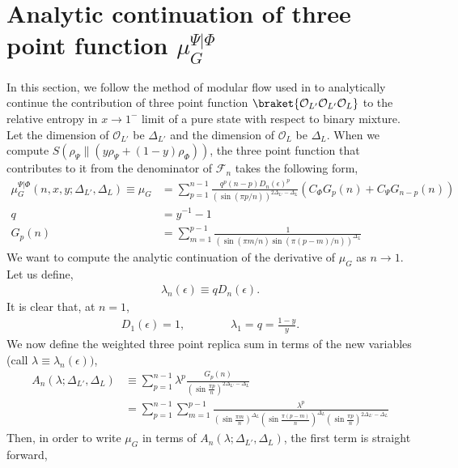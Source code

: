 \documentclass[11pt]{article}
\newcommand{\ep}{\epsilon}
\newcommand{\mO}{\mathcal{O}}
\newcommand{\lb}{\left(}
\newcommand{\rb}{\right)}
\begin{document}
\section{\texorpdfstring{Analytic continuation of three point function $\mu_G^{\Psi|\Phi}$}{Analytic continuation of three point function mu large interval}}
In this section, we follow the method of modular flow used in \cite{S_rosi_2018} to analytically continue the contribution of three point function $\braket{\mO_{L'}\mO_{L'}\mO_L}$ to the relative entropy in $x\to 1^-$ limit of a pure state with respect to binary mixture. Let the dimension of $\mO_{L'}$ be $\Delta_{L'}$ and the dimension of $\mO_L$ be $\Delta_L$. When we compute $S(\rho_\Psi \| \lb y\rho_\Psi + (1-y)\rho_\Phi\rb)$, the three point function that contributes to it from the denominator of $\mathcal{F}_n$ takes the following form,
\begin{align}
    \mu_G^{\Psi|\Phi} (n,x,y;\Delta_{L'},\Delta_L) \equiv \mu_G &= \sum_{p=1}^{n-1}   \frac{q^p (n-p)D_n(\ep)^{p}}{\lb \sin(\pi p/n)\rb^{2\Delta_{L'}-\Delta_L}} \lb C_\Phi G_p(n) + C_\Psi G_{n-p}(n)\rb \\
    q &= y^{-1}-1 \\
    G_p(n) &= \sum_{m=1}^{p-1} \frac{1}{\lb \sin(\pi m/n) \sin(\pi (p-m)/n)\rb^{\Delta_L}}
\end{align}
We want to compute the analytic continuation of the derivative of $\mu_G$ as $n\to 1$. Let us define,
\begin{align}
    \lambda_n(\ep) \equiv  qD_n(\ep).
\end{align}
It is clear that, at $n=1$, 
\begin{align}
    D_1(\ep) = 1, \qquad\qquad \lambda_1 = q = \frac{1-y}{y}.
\end{align}
We now define the weighted three point replica sum in terms of the new variables (call $\lambda \equiv \lambda_n(\ep))$,
\begin{align}
    A_n(\lambda;\Delta_{L'},\Delta_L) &\equiv \sum_{p=1}^{n-1}\lambda^p \frac{G_p(n)}{\lb\sin \frac{\pi p}{n}\rb^{2\Delta_{L'}-\Delta_L}}\\
    &= \sum_{p=1}^{n-1}\sum_{m=1}^{p-1}\frac{\lambda^p}{\lb\sin \frac{\pi m}{n}\rb^{\Delta_L} \lb\sin \frac{\pi (p-m)}{n}\rb^{\Delta_L} \lb\sin \frac{\pi p}{n}\rb^{2\Delta_{L'}-\Delta_L}}
\end{align}
Then, in order to write $\mu_G$ in terms of $A_n(\lambda;\Delta_{L'},\Delta_L)$, the first term is straight forward,
\end{document}

